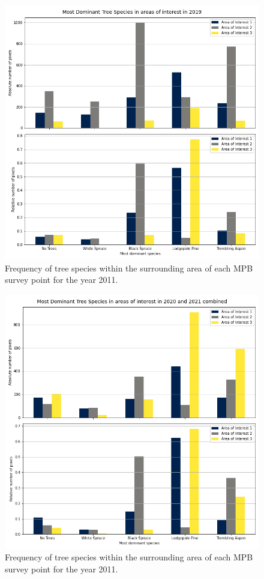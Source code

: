 \documentclass[
]{article}
\begin{document}
\begin{figure}

{\centering \includegraphics[width=0.8\linewidth]{../graphics/freq_species_19} 

}

\caption{Frequency of tree species within the surrounding area of each MPB survey point for the year 2011.}\label{fig:freqSpecies19}
\end{figure}
\begin{figure}

{\centering \includegraphics[width=0.8\linewidth]{../graphics/freq_species_20_21} 

}

\caption{Frequency of tree species within the surrounding area of each MPB survey point for the year 2011.}\label{fig:freqSpecies20-21}
\end{figure}
\end{document}
